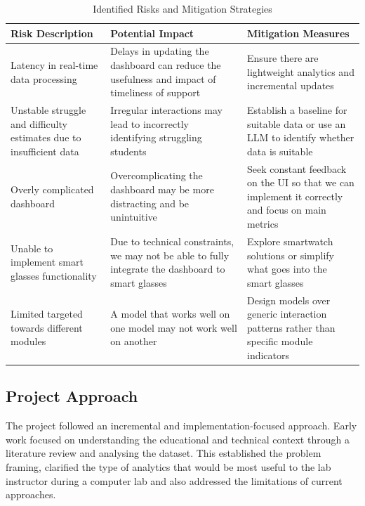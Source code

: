 \begin{table}[h]
\centering
\renewcommand{\arraystretch}{1.2}
\begin{tabular}{|p{}|p{}|p{}|}
        \hline
        \textbf{Risk Description}  & \textbf{Potential Impact} & \textbf{Mitigation Measures}\\ [0.5ex]
         \hline \hline
          Latency in real-time data processing& Delays in updating the dashboard can reduce the usefulness and impact of timeliness of support & Ensure there are lightweight analytics and incremental updates \\
          \hline
          Unstable struggle and difficulty estimates due to insufficient data& Irregular interactions may lead to incorrectly identifying struggling students & Establish a baseline for suitable data or use an LLM to identify whether data is suitable \\
          \hline
          Overly complicated dashboard&Overcomplicating the dashboard may be more distracting and be unintuitive &  Seek constant feedback on the UI so that we can implement it correctly and focus on main metrics\\
          \hline
          Unable to implement smart glasses functionality& Due to technical constraints, we may not be able to fully integrate the dashboard to smart glasses & Explore smartwatch solutions or simplify what goes into the smart glasses \\
          \hline
          Limited targeted towards different modules& A model that works well on one model may not work well on another  & Design models over generic interaction patterns rather than specific module indicators \\
         \hline
\end{tabular}
\caption{Identified Risks and Mitigation Strategies}
\label{tab:risks}
\end{table}

\subsection{Project Approach}

The project followed an incremental and implementation-focused approach.
Early work focused on understanding the educational and technical context through a literature review and analysing the dataset.
This established the problem framing, clarified the type of analytics that would be most useful to the lab instructor during a computer lab and also addressed the limitations of current approaches.

